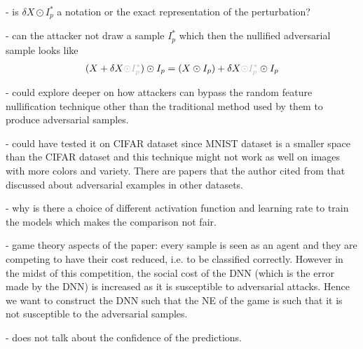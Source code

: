 \documentclass[a4paper,10pt]{article}
\theoremstyle{definition}
\begin{document}
- is $\delta X \odot I_p^\ast$ a notation or the exact representation of the perturbation?

- can the attacker not draw a sample $I_p^\ast$ which then the nullified adversarial sample looks like
\begin{align*}
(X+\delta X {\color{black!30}\odot I_p^\ast}) \odot I_p = (X \odot I_p) + \delta X {\color{black!30}\odot I_p^\ast} \odot I_p
\end{align*}


- could explore deeper on how attackers can bypass the random feature nullification technique other than the traditional method used by them to produce adversarial samples.

- could have tested it on CIFAR dataset since MNIST dataset is a smaller space than the CIFAR dataset and this technique might not work as well on images with more colors and variety. There are papers that the author cited from that discussed about adversarial examples in other datasets.

- why is there a choice of different activation function and learning rate to train the models which makes the comparison not fair.

- game theory aspects of the paper: every sample is seen as an agent and they are competing to have their cost reduced, i.e. to be classified correctly. However in the midst of this competition, the social cost of the DNN (which is the error made by the DNN) is increased as it is susceptible to adversarial attacks. Hence we want to construct the DNN such that the NE of the game is such that it is not susceptible to the adversarial samples.

- does not talk about the confidence of the predictions.

\newpage

 

\end{document}
